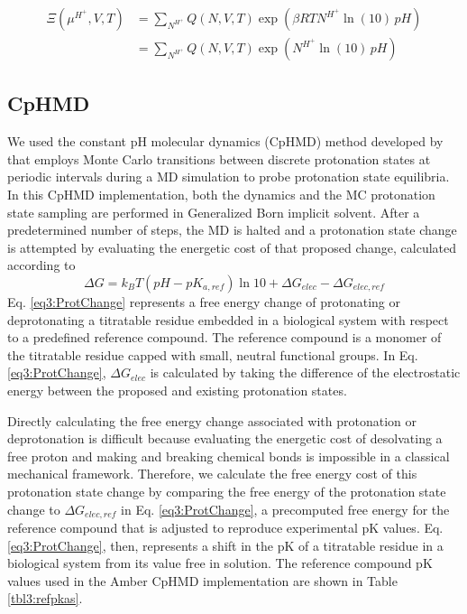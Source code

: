 \begin{align}
   \Xi(\mu ^ {H^+}, V, T) & = \sum _ {N^{H^+}} Q(N, V, T) \exp(\beta RT N^{H^+}
                  \ln(10)\, pH) \nonumber \\
                          & = \sum _ {N^{H^+}} Q(N, V, T) \exp(N^{H^+} \ln(10)\,
                  pH)
   \label{eq3:SemiGrandPF}
\end{align}

\subsection{CpHMD}

We used the constant pH molecular dynamics (CpHMD) method developed by
\citeauthor{Mongan2004} \cite{Mongan2004} that employs Monte Carlo transitions
between discrete protonation states at periodic intervals during a MD simulation
to probe protonation state equilibria. In this CpHMD implementation, both the
dynamics and the MC protonation state sampling are performed in Generalized Born
implicit solvent. After a predetermined number of steps, the MD is halted and a
protonation state change is attempted by evaluating the energetic cost of that
proposed change, calculated according to \cite{Mongan2004}
\begin{equation}
   \Delta G = k _ B T \left( pH - pK _ {a,ref} \right) \ln 10 + \Delta G _
         {elec} - \Delta G _ {elec,ref}
   \label{eq3:ProtChange}
\end{equation}
Eq. \ref{eq3:ProtChange} represents a free energy change of protonating or
deprotonating a titratable residue embedded in a biological system with respect
to a predefined reference compound. The reference compound is a monomer of the
titratable residue capped with small, neutral functional groups. In Eq.
\ref{eq3:ProtChange}, $\Delta G _ {elec}$ is calculated by taking the difference
of the electrostatic energy between the proposed and existing protonation
states. \cite{Mongan2004}

Directly calculating the free energy change associated with protonation or
deprotonation is difficult because evaluating the energetic cost of desolvating
a free proton and making and breaking chemical bonds is impossible in a
classical mechanical framework. Therefore, we calculate the free energy cost of
this protonation state change by comparing the free energy of the protonation
state change to $\Delta G _ {elec,ref}$ in Eq. \ref{eq3:ProtChange}, a
precomputed free energy for the reference compound that is adjusted to reproduce
experimental pK values. Eq. \ref{eq3:ProtChange}, then, represents a
shift in the pK of a titratable residue in a biological system from its
value free in solution. The reference compound pK values used in the
Amber CpHMD implementation \cite{Mongan2004} are shown in Table
\ref{tbl3:refpkas}.

